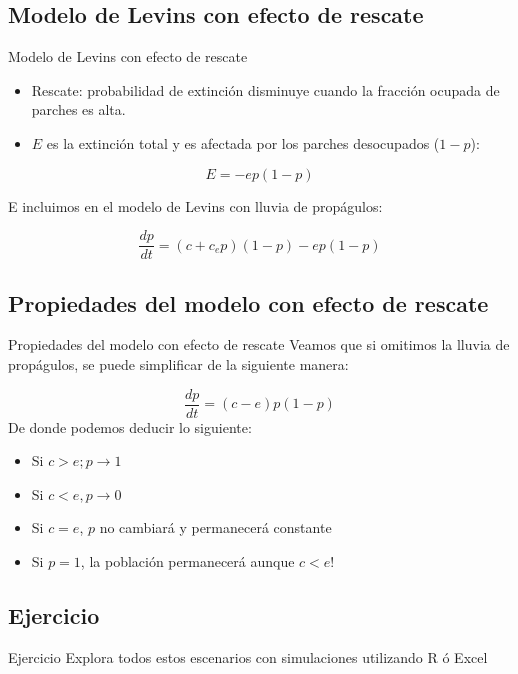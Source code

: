 \documentclass[
  11pt,
  ignorenonframetext,
]{beamer}
\begin{document}
\subsection{Modelo de Levins con efecto de
rescate}\label{modelo-de-levins-con-efecto-de-rescate}

\begin{frame}{Modelo de Levins con efecto de rescate}
\begin{itemize}
\item
  Rescate: probabilidad de extinción disminuye cuando la fracción
  ocupada de parches es alta.
\item
  \(E\) es la extinción total y es afectada por los parches desocupados
  (\(1-p\)):
\end{itemize}

\[E = -ep(1-p)\]

E incluimos en el modelo de Levins con lluvia de propágulos:

\[\frac{dp}{dt} = (c + c_e p)(1-p) - ep(1-p)\]
\end{frame}

\subsection{Propiedades del modelo con efecto de
rescate}\label{propiedades-del-modelo-con-efecto-de-rescate}

\begin{frame}{Propiedades del modelo con efecto de rescate}
Veamos que si omitimos la lluvia de propágulos, se puede simplificar de
la siguiente manera:

\[\frac{dp}{dt} = (c - e)p(1-p)\] De donde podemos deducir lo siguiente:

\begin{itemize}
\item
  Si \(c > e; p \rightarrow 1\)
\item
  Si \(c < e, p \rightarrow 0\)
\item
  Si \(c = e\), \(p\) no cambiará y permanecerá constante
\item
  Si \(p = 1\), la población permanecerá aunque \(c < e\)!
\end{itemize}
\end{frame}

\subsection{Ejercicio}\label{ejercicio}

\begin{frame}{Ejercicio}
Explora todos estos escenarios con simulaciones utilizando R ó Excel
\end{frame}
\end{document}
